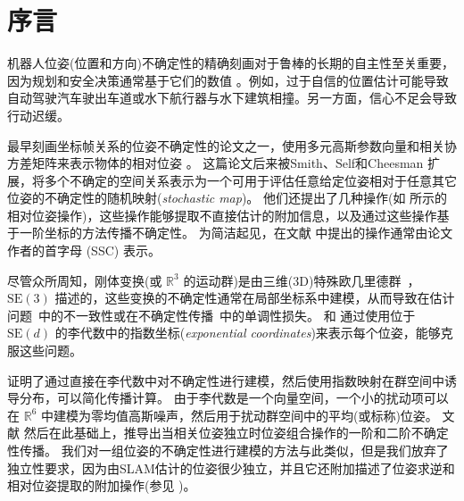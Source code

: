 \section{序言}

机器人位姿(位置和方向)不确定性的精确刻画对于鲁棒的长期的自主性至关重要，因为规划和安全决策通常基于它们的数值 \cite{thrun2005probabilistic}。例如，过于自信的位置估计可能导致自动驾驶汽车驶出车道或水下航行器与水下建筑相撞。另一方面，信心不足会导致行动迟缓。  

最早刻画坐标帧关系的位姿不确定性的论文之一，使用多元高斯参数向量和相关协方差矩阵来表示物体的相对位姿 \cite{smith1986a}。 
这篇论文后来被Smith、Self和Cheesman \cite{smith1990a} 扩展，将多个不确定的空间关系表示为一个可用于评估任意给定位姿相对于任意其它位姿的不确定性的随机映射(\textit{stochastic map})。 
他们还提出了几种操作(如  所示的相对位姿操作)，这些操作能够提取不直接估计的附加信息，以及通过这些操作基于一阶坐标的方法传播不确定性。 
为简洁起见，在文献 \cite{smith1990a} 中提出的操作通常由论文作者的首字母 (SSC) 表示。 



尽管众所周知，刚体变换(或 $\mathbb{R}^3$ 的运动群)是由三维(3D)特殊欧几里德群~\citep{spong2005robot,murray1994mathematical}，$\mathrm{SE}(3)$ 描述的，这些变换的不确定性通常在局部坐标系中建模，从而导致在估计问题~\citep{huang2007convergence}中的不一致性或在不确定性传播~\citep{rodriguez2018importance}中的单调性损失。\citet{wang2008nonparametric} 和 \citet{long2013banana} 通过使用位于 $\mathrm{SE}(d)$ 的李代数中的指数坐标(\emph{exponential coordinates})来表示每个位姿，能够克服这些问题。 
 
\citet{barfoot2014associating} 证明了通过直接在李代数中对不确定性进行建模，然后使用指数映射在群空间中诱导分布，可以简化传播计算。 
由于李代数是一个向量空间，一个小的扰动项可以在 $\mathbb{R}^6$ 中建模为零均值高斯噪声，然后用于扰动群空间中的平均(或标称)位姿。 
文献 \cite{barfoot2014associating} 然后在此基础上，推导出当相关位姿独立时位姿组合操作的一阶和二阶不确定性传播。 
我们对一组位姿的不确定性进行建模的方法与此类似，但是我们放弃了独立性要求，因为由SLAM估计的位姿很少独立，并且它还附加描述了位姿求逆和相对位姿提取的附加操作(参见 )。 

